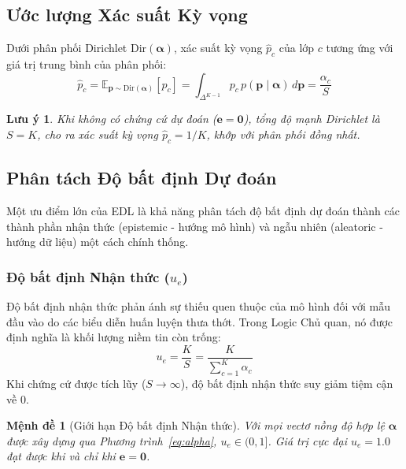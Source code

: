\documentclass[11pt]{article}
\newtheorem{proposition}{Mệnh đề}
\newtheorem{remark}{Lưu ý}
\newcommand{\Dir}{\text{Dir}}
\newcommand{\E}{\mathbb{E}}
\begin{document}
\subsection{Ước lượng Xác suất Kỳ vọng}\label{subsec:expected_prob}

Dưới phân phối Dirichlet $\Dir(\bm{\alpha})$, xác suất kỳ vọng $\hat{p}_c$ của lớp $c$ tương ứng với giá trị trung bình của phân phối:
\begin{equation}\label{eq:expected_p}
    \hat{p}_c = \E_{\bm{p} \sim \Dir(\bm{\alpha})}[p_c] = \int_{\Delta^{K-1}} p_c \, p(\bm{p} \mid \bm{\alpha}) \, d\bm{p} = \frac{\alpha_c}{S}
\end{equation}

\begin{remark}
Khi không có chứng cứ dự đoán ($\bm{e} = \bm{0}$), tổng độ mạnh Dirichlet là $S = K$, cho ra xác suất kỳ vọng $\hat{p}_c = 1/K$, khớp với phân phối đồng nhất.
\end{remark}

\subsection{Phân tách Độ bất định Dự đoán}\label{subsec:uncertainty}

Một ưu điểm lớn của EDL là khả năng phân tách độ bất định dự đoán thành các thành phần nhận thức (epistemic - hướng mô hình) và ngẫu nhiên (aleatoric - hướng dữ liệu) một cách chính thống.

\subsubsection{Độ bất định Nhận thức ($u_e$)}

Độ bất định nhận thức phản ánh sự thiếu quen thuộc của mô hình đối với mẫu đầu vào do các biểu diễn huấn luyện thưa thớt. Trong Logic Chủ quan, nó được định nghĩa là khối lượng niềm tin còn trống:
\begin{equation}\label{eq:u_e}
    u_e = \frac{K}{S} = \frac{K}{\sum_{c=1}^K \alpha_c}
\end{equation}
Khi chứng cứ được tích lũy ($S \to \infty$), độ bất định nhận thức suy giảm tiệm cận về $0$.

\begin{proposition}[Giới hạn Độ bất định Nhận thức]
Với mọi vectơ nồng độ hợp lệ $\bm{\alpha}$ được xây dựng qua Phương trình~\ref{eq:alpha}, $u_e \in (0, 1]$. Giá trị cực đại $u_e = 1.0$ đạt được khi và chỉ khi $\bm{e} = \bm{0}$.
\end{proposition}
\end{document}
